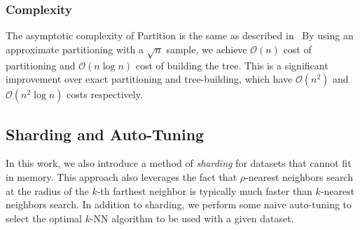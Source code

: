 

\subsubsection {Complexity}
\label{subsubsec:methods:clustering:clustering:complexity}

The asymptotic complexity of Partition is the same as described in~\cite{ishaq2019clustered}
By using an approximate partitioning with a $\sqrt{n}$ sample, we achieve $\mathcal{O}(n)$ cost of partitioning and $\mathcal{O}(n \log n)$ cost of building the tree.
This is a significant improvement over exact partitioning and tree-building, which have $\mathcal{O}(n^2)$ and $\mathcal{O}(n^2 \log n)$ costs respectively.


\subsection {Sharding and Auto-Tuning}
\label{subsec:methods:sharding-and-auto-tuning}

In this work, we also introduce a method of \emph{sharding} for datasets that cannot fit in memory.
This approach also leverages the fact that $\rho$-nearest neighbors search at the radius of the $k$-th farthest neighbor is typically much faster than $k$-nearest neighbors search.
In addition to sharding, we perform some naive auto-tuning to select the optimal $k$-NN algorithm to be used with a given dataset.

